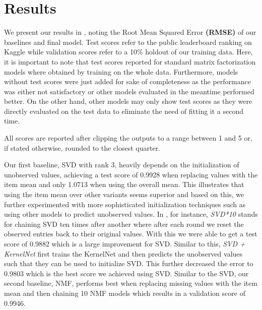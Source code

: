 \documentclass[10pt,conference,compsocconf]{IEEEtran}
\begin{document}
    \section{Results}
    We present our results in , noting the Root Mean Squared Error \textbf{(RMSE)} of our baselines and final model.
    Test scores refer to the public leaderboard ranking on Kaggle while validation scores refer to a 10\% holdout of our training data.
    Here, it is important to note that test scores reported for standard matrix factorization models where obtained by training on the whole data.
    Furthermore, models without test scores were just added for sake of completeness as the performance was either not satisfactory or other models evaluated in the meantime performed better.
    On the other hand, other models may only show test scores as they were directly evaluated on the test data to eliminate the need of
    fitting it a second time.

    All scores are reported after clipping the outputs to a range between 1 and 5 or, if stated otherwise, rounded to the closest quarter.

    Our first baseline, SVD with rank 3, heavily depends on the initialization of unobserved values, achieving a test score of 0.9928 when replacing values with the item mean and only 1.0713 when using the overall mean.
    This illustrates that using the item mean over other variants seems superior and based on this, we further experimented with more sophisticated initialization techniques such as using other models to predict unobserved values.
    In , for instance, \textit{SVD*10} stands for chaining SVD ten times after another where after each round we reset the observed entries back to their original values.
    With this we were able to get a test score of 0.9882 which is a large improvement for SVD.
    Similar to this, \textit{SVD + KernelNet} first trains the KernelNet and then predicts the unobserved values such that they can be used to initialize SVD.
    This further decreased the error to 0.9803 which is the best score we achieved using SVD.
    Similar to the SVD, our second baseline, NMF, performs best when replacing missing values with the item mean and then chaining 10 NMF models which results in a validation score of 0.9946.
\end{document}
